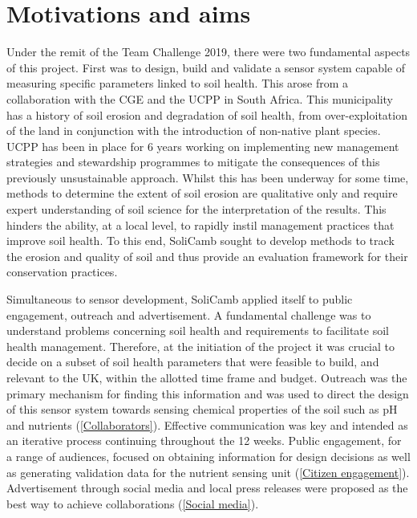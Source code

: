 \section{Motivations and aims}

Under the remit of the Team Challenge 2019, there were two fundamental aspects of this project. First was to design, build and validate a sensor system capable of measuring specific parameters linked to soil health. This arose from a collaboration with the \gls{CGE} and the \gls{UCPP} in South Africa. This municipality has a history of soil erosion and degradation of soil health, from over-exploitation of the land in conjunction with the introduction of non-native plant species. UCPP has been in place for 6 years working on implementing new management strategies and stewardship programmes to mitigate the consequences of this previously unsustainable approach. Whilst this has been underway for some time, methods to determine the extent of soil erosion are qualitative only and require expert understanding of soil science for the interpretation of the results. This hinders the ability, at a local level, to rapidly instil management practices that improve soil health. To this end, SoliCamb sought to develop methods to track the erosion and quality of soil and thus provide an evaluation framework for their conservation practices. 

Simultaneous to sensor development, SoliCamb applied itself to public engagement, outreach and advertisement. A fundamental challenge was to understand problems concerning soil health and requirements to facilitate soil health management. Therefore, at the initiation of the project it was crucial to decide on a subset of soil health parameters that were feasible to build, and relevant to the UK, within the allotted time frame and budget. Outreach was the primary mechanism for finding this information and was used to direct the design of this sensor system towards sensing chemical properties of the soil such as pH and nutrients (\cref{Collaborators}). Effective communication was key and intended as an iterative process continuing throughout the 12 weeks. Public engagement, for a range of audiences, focused on obtaining information for design decisions as well as generating validation data for the nutrient sensing unit (\cref{Citizen engagement}). %
Advertisement through social media and local press releases were proposed as the best way to achieve collaborations (\cref{Social media}). %

